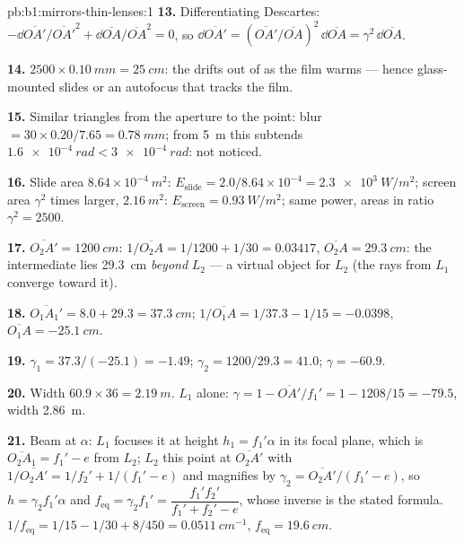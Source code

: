 \begin{solution}{pb:b1:mirrors-thin-lenses:1}
\textbf{13.} Differentiating Descartes: $-\dd\overline{OA'}/\overline{OA'}^2
+ \dd\overline{OA}/\overline{OA}^2 = 0$, so $\dd\overline{OA'} =
(\overline{OA'}/\overline{OA})^2\,\dd\overline{OA} = \gamma^2\,\dd\overline{OA}$.

\textbf{14.} $2500 \times \qty{0.10}{mm} = \qty{25}{cm}$: the 
drifts out of  as the film warms --- hence glass-mounted slides or
an autofocus that tracks the film.

\textbf{15.} Similar triangles from the aperture to the  point:
blur $= 30 \times 0.20/7.65 = \qty{0.78}{mm}$; from \qty{5}{m} this
subtends $\qty{1.6e-4}{rad} < \qty{3e-4}{rad}$: not noticed.

\textbf{16.} Slide area $8.64\times10^{-4}\ \unit{m^2}$: $E_{\text{slide}}
= 2.0/8.64\times10^{-4} = \qty{2.3e3}{W/m^2}$; screen area $\gamma^2$
times larger, $\qty{2.16}{m^2}$: $E_{\text{screen}} = \qty{0.93}{W/m^2}$;
same power, areas in ratio $\gamma^2 = 2500$.

\textbf{17.} $\overline{O_2A'} = \qty{1200}{cm}$: $1/\overline{O_2A} =
1/1200 + 1/30 = 0.03417$, $\overline{O_2A} = \qty{+29.3}{cm}$: the
intermediate  lies \qty{29.3}{cm} \emph{beyond} $L_2$ --- a virtual
object for $L_2$ (the rays from $L_1$ converge toward it).

\textbf{18.} $\overline{O_1A_1'} = 8.0 + 29.3 = \qty{37.3}{cm}$;
$1/\overline{O_1A} = 1/37.3 - 1/15 = -0.0398$, $\overline{O_1A} =
\qty{-25.1}{cm}$.

\textbf{19.} $\gamma_1 = 37.3/(-25.1) = -1.49$; $\gamma_2 = 1200/29.3 =
41.0$; $\gamma = -60.9$.

\textbf{20.} Width $60.9 \times 36 = \qty{2.19}{m}$. $L_1$ alone:
$\gamma = 1 - \overline{OA'}/f_1' = 1 - 1208/15 = -79.5$, width
\qty{2.86}{m}.

\textbf{21.} Beam at $\alpha$: $L_1$ focuses it at height $h_1 = f_1'\alpha$
in its focal plane, which is $\overline{O_2A_1} = f_1' - e$ from $L_2$;
$L_2$  this point at $\overline{O_2A'}$ with $1/\overline{O_2A'}
= 1/f_2' + 1/(f_1' - e)$ and magnifies by $\gamma_2 = \overline{O_2A'}/(f_1'
- e)$, so $h = \gamma_2 f_1'\alpha$ and $f_{\mathrm{eq}} = \gamma_2 f_1'
= \dfrac{f_1' f_2'}{f_1' + f_2' - e}$, whose inverse is the stated
formula. $1/f_{\mathrm{eq}} = 1/15 - 1/30 + 8/450 = \qty{0.0511}{cm^{-1}}$,
$f_{\mathrm{eq}} = \qty{19.6}{cm}$.


\end{solution}
